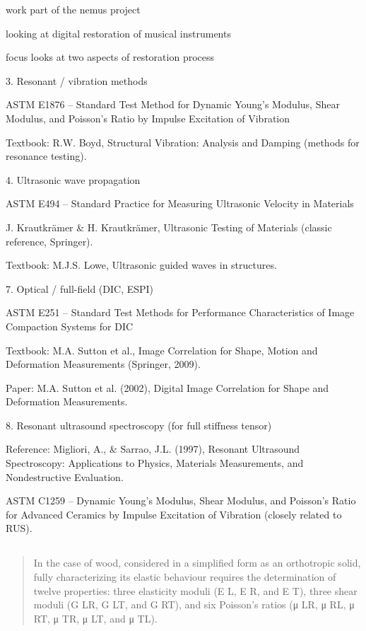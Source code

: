 work part of the nemus project 


looking at digital restoration of musical instruments

focus looks at two aspects of restoration process



3. Resonant / vibration methods

ASTM E1876 – Standard Test Method for Dynamic Young’s Modulus, Shear Modulus, and Poisson’s Ratio by Impulse Excitation of Vibration

Textbook: R.W. Boyd, Structural Vibration: Analysis and Damping (methods for resonance testing).

4. Ultrasonic wave propagation

ASTM E494 – Standard Practice for Measuring Ultrasonic Velocity in Materials

J. Krautkrämer & H. Krautkrämer, Ultrasonic Testing of Materials (classic reference, Springer).

Textbook: M.J.S. Lowe, Ultrasonic guided waves in structures.

7. Optical / full-field (DIC, ESPI)

ASTM E251 – Standard Test Methods for Performance Characteristics of Image Compaction Systems for DIC

Textbook: M.A. Sutton et al., Image Correlation for Shape, Motion and Deformation Measurements (Springer, 2009).

Paper: M.A. Sutton et al. (2002), Digital Image Correlation for Shape and Deformation Measurements.

8. Resonant ultrasound spectroscopy (for full stiffness tensor)

Reference: Migliori, A., & Sarrao, J.L. (1997), Resonant Ultrasound Spectroscopy: Applications to Physics, Materials Measurements, and Nondestructive Evaluation.

ASTM C1259 – Dynamic Young’s Modulus, Shear Modulus, and Poisson’s Ratio for Advanced Ceramics by Impulse Excitation of Vibration (closely related to RUS).


\subsection{\cite{}}

\begin{quotation}
    In the case of wood, considered in a simplified form as an orthotropic solid, fully characterizing its elastic behaviour requires the determination of twelve properties: three elasticity moduli (E L, E R, and E T), three shear moduli (G LR, G LT, and G RT), and six Poisson’s ratios (μ LR, μ RL, μ RT, μ TR, μ LT, and μ TL).
\end{quotation}



